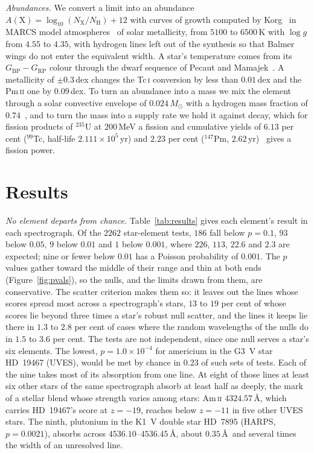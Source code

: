 \documentclass[3p,11pt]{elsarticle}
\newcommand{\sci}[2]{#1\times10^{#2}}
\newcommand{\ion}[2]{#1\,\textsc{#2}}
\newcommand{\nuc}[2]{$^{#1}$#2}
\begin{document}
\emph{Abundances.} We convert a limit into an abundance $A(\mathrm{X})=\log_{10}
(N_\mathrm{X}/N_\mathrm{H})+12$ with curves of growth computed by
Korg~\cite{Wheeler2023} in MARCS model atmospheres~\cite{Gustafsson2008} of solar
metallicity, from $5100$ to $6500$\,K with $\log g$ from $4.55$ to $4.35$, with hydrogen
lines left out of the synthesis so that Balmer wings do not enter the equivalent width.
A star's temperature comes from its $G_\mathrm{BP}-G_\mathrm{RP}$ colour through the dwarf
sequence of Pecaut and Mamajek~\cite{PecautMamajek2013}. A metallicity of $\pm0.3$\,dex
changes the \ion{Tc}{i} conversion by less than $0.01$\,dex and the \ion{Pm}{ii} one by
$0.09$\,dex. To turn an abundance into a mass we mix the element through a solar
convective envelope of $0.024\,M_\odot$ with a hydrogen mass fraction of
$0.74$~\cite{Bahcall2006}, and to turn the mass into a supply rate we hold it against
decay, which for fission products of \nuc{235}{U} at $200$\,MeV a fission and
cumulative yields of $6.13$ per cent (\nuc{99}{Tc}, half-life $\sci{2.111}{5}$\,yr) and
$2.23$ per cent (\nuc{147}{Pm}, $2.62$\,yr)~\cite{JEFF31} gives a fission power.

\section{Results}\label{sec:results}

\emph{No element departs from chance.} Table~\ref{tab:results} gives each element's
result in each spectrograph. Of the $2262$ star-element tests, $186$ fall below $p=0.1$,
$93$ below $0.05$, $9$ below $0.01$ and $1$ below $0.001$, where $226$, $113$, $22.6$ and
$2.3$ are expected; nine or fewer below $0.01$ has a Poisson probability of $0.001$. The
$p$ values gather toward the middle of their range and thin at both ends
(Figure~\ref{fig:pvals}), so the nulls, and the limits drawn from them, are
conservative. The scatter criterion makes them so: it leaves out the lines whose scores
spread most across a spectrograph's stars, $13$ to $19$ per cent of whose scores lie
beyond three times a star's robust null scatter, and the lines it keeps lie there in
$1.3$ to $2.8$ per cent of cases where the random wavelengths of the nulls do in $1.5$ to
$3.6$ per cent. The tests are not independent, since one null serves a star's six
elements. The lowest, $p=\sci{1.0}{-4}$ for americium in the G3~V star
HD~19467 (UVES), would be met by chance in $0.23$ of such sets of tests. Each of the nine
takes most of its absorption from one line. At eight of those lines at least six other
stars of the same spectrograph absorb at least half as deeply, the mark of a stellar
blend whose strength varies among stars: \ion{Am}{ii} $4324.57$\,\AA, which carries
HD~19467's score at $z=-19$, reaches below $z=-11$ in five other UVES stars. The ninth,
plutonium in the K1~V double star HD~7895 (HARPS, $p=0.0021$), absorbs across
$4536.10$--$4536.45$\,\AA, about $0.35$\,\AA\ and several times the width of an
unresolved line.
\end{document}
